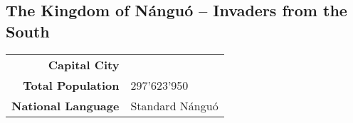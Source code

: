 \subsection{The Kingdom of N\'angu\'o -- Invaders from the South}
\begin{tabular}{r | l}
    \textbf{Capital City} & \\
    \textbf{Total Population} & 297'623'950\\
    \textbf{National Language} & Standard N\'angu\'o
\end{tabular}
